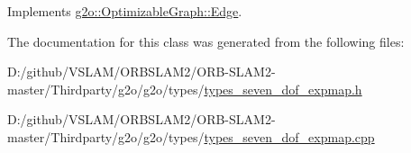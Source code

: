 Implements \mbox{\hyperlink{classg2o_1_1_optimizable_graph_1_1_edge_a804b9a2178249b9297c55b8fbbeda56e}{g2o\+::\+Optimizable\+Graph\+::\+Edge}}.



The documentation for this class was generated from the following files\+:\begin{DoxyCompactItemize}
\item 
D\+:/github/\+V\+S\+L\+A\+M/\+O\+R\+B\+S\+L\+A\+M2/\+O\+R\+B-\/\+S\+L\+A\+M2-\/master/\+Thirdparty/g2o/g2o/types/\mbox{\hyperlink{types__seven__dof__expmap_8h}{types\+\_\+seven\+\_\+dof\+\_\+expmap.\+h}}\item 
D\+:/github/\+V\+S\+L\+A\+M/\+O\+R\+B\+S\+L\+A\+M2/\+O\+R\+B-\/\+S\+L\+A\+M2-\/master/\+Thirdparty/g2o/g2o/types/\mbox{\hyperlink{types__seven__dof__expmap_8cpp}{types\+\_\+seven\+\_\+dof\+\_\+expmap.\+cpp}}\end{DoxyCompactItemize}
